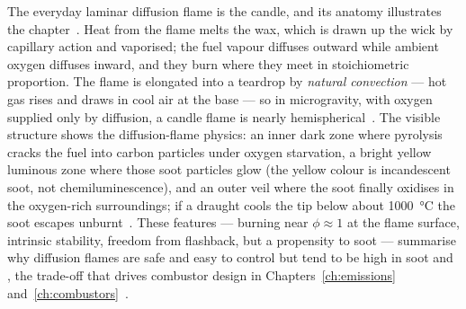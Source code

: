 The everyday laminar diffusion flame is the candle, and its anatomy illustrates the chapter~\cite{lecture5}. Heat from the flame melts the wax, which is drawn up the wick by capillary action and vaporised; the fuel vapour diffuses outward while ambient oxygen diffuses inward, and they burn where they meet in stoichiometric proportion. The flame is elongated into a teardrop by \emph{natural convection} --- hot gas rises and draws in cool air at the base --- so in microgravity, with oxygen supplied only by diffusion, a candle flame is nearly hemispherical~\cite{lecture5}. The visible structure shows the diffusion-flame physics: an inner dark zone where pyrolysis cracks the fuel into carbon particles under oxygen starvation, a bright yellow luminous zone where those soot particles glow (the yellow colour is incandescent soot, not chemiluminescence), and an outer veil where the soot finally oxidises in the oxygen-rich surroundings; if a draught cools the tip below about \SI{1000}{\celsius} the soot escapes unburnt~\cite{lecture5}. These features --- burning near $\phi\approx1$ at the flame surface, intrinsic stability, freedom from flashback, but a propensity to soot --- summarise why diffusion flames are safe and easy to control but tend to be high in soot and , the trade-off that drives combustor design in Chapters~\ref{ch:emissions} and~\ref{ch:combustors}~\cite{lecture5}.
